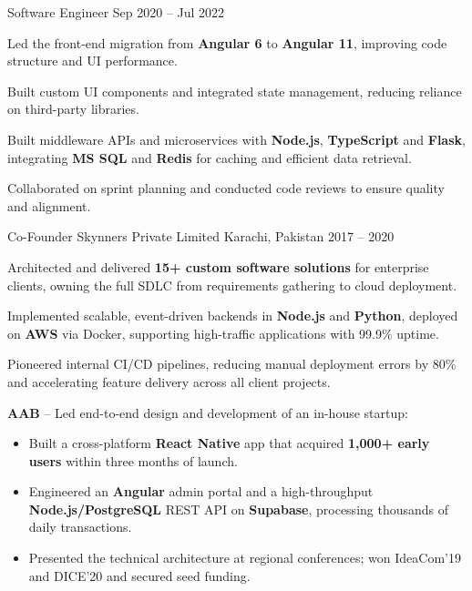 \begin{cventries}
  \vspace{3.5mm}
  \cventry
    {Software Engineer}
    {}
    {}
    {Sep 2020 – Jul 2022}
    {
    \begin{cvitems}
      \item {Led the front-end migration from \textbf{Angular 6} to \textbf{Angular 11}, improving code structure and UI performance.}
      \item {Built custom UI components and integrated state management, reducing reliance on third-party libraries.}
      \item {Built middleware APIs and microservices with \textbf{Node.js}, \textbf{TypeScript} and \textbf{Flask}, integrating \textbf{MS SQL} and \textbf{Redis} for caching and efficient data retrieval.}
      \item {Collaborated on sprint planning and conducted code reviews to ensure quality and alignment.}
    \end{cvitems}
    }

  \vspace{3.5mm}
  \cventry
    {Co-Founder}
    {Skynners Private Limited}
    {Karachi, Pakistan}
    {2017 – 2020}
    {
    \begin{cvitems}
      \item {Architected and delivered \textbf{15+ custom software solutions} for enterprise clients, owning the full SDLC from requirements gathering to cloud deployment.}
      \item {Implemented scalable, event-driven backends in \textbf{Node.js} and \textbf{Python}, deployed on \textbf{AWS} via Docker, supporting high-traffic applications with 99.9\% uptime.}
      \item {Pioneered internal CI/CD pipelines, reducing manual deployment errors by 80\% and accelerating feature delivery across all client projects.}
      \item {\textbf{AAB} – Led end-to-end design and development of an in-house startup:}
        \begin{itemize}
          \item {Built a cross-platform \textbf{React Native} app that acquired \textbf{1,000+ early users} within three months of launch.}
          \item {Engineered an \textbf{Angular} admin portal and a high-throughput \textbf{Node.js/PostgreSQL} REST API on \textbf{Supabase}, processing thousands of daily transactions.}
          \item {Presented the technical architecture at regional conferences; won IdeaCom'19 and DICE'20 and secured seed funding.}
        \end{itemize}
    \end{cvitems}
    }

\end{cventries}
